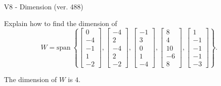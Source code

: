 \begin{exercise}
  \begin{exerciseTitle}V8 - Dimension (ver. 488)\end{exerciseTitle}
  \begin{exerciseStatement}
    Explain how to find the dimension of 
\[W=\mathrm{span}\ \left\{\left[\begin{array}{r}
0 \\
-4 \\
-1 \\
1 \\
-2
\end{array}\right] , \left[\begin{array}{r}
-4 \\
2 \\
-4 \\
2 \\
-2
\end{array}\right] , \left[\begin{array}{r}
-1 \\
3 \\
0 \\
1 \\
-4
\end{array}\right] , \left[\begin{array}{r}
8 \\
4 \\
10 \\
-6 \\
8
\end{array}\right] , \left[\begin{array}{r}
1 \\
-1 \\
-1 \\
-1 \\
-3
\end{array}\right]\right\}.\]



  \end{exerciseStatement}
  \begin{exerciseAnswer}
   The dimension of \(W\) is  \(4\).
  


  \end{exerciseAnswer}
\end{exercise}